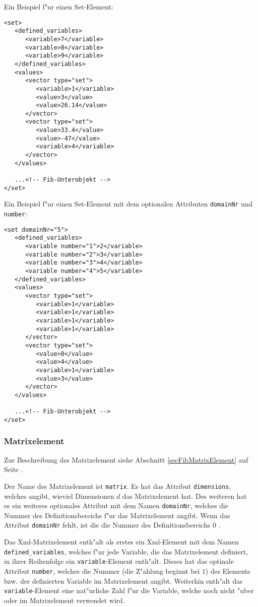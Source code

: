 \bigskip\noindent
Ein Beispiel f"ur einen Set-Element:
\begin{verbatim}
<set>
   <defined_variables>
      <variable>7</variable>
      <variable>8</variable>
      <variable>9</variable>
   </defined_variables>
   <values>
      <vector type="set">
         <variable>1</variable>
         <value>3</value>
         <value>26.14</value>
      </vector>
      <vector type="set">
         <value>33.4</value>
         <value>-47</value>
         <variable>4</variable>
      </vector>
   </values>

   ...<!-- Fib-Unterobjekt -->
</set>
\end{verbatim}

\noindent
Ein Beispiel f"ur einen Set-Element mit dem optionalen Attributen \verb|domainNr| und \verb|number|:
\begin{verbatim}
<set domainNr="5">
   <defined_variables>
      <variable number="1">2</variable>
      <variable number="2">3</variable>
      <variable number="3">4</variable>
      <variable number="4">5</variable>
   </defined_variables>
   <values>
      <vector type="set">
         <variable>1</variable>
         <variable>1</variable>
         <variable>1</variable>
         <variable>1</variable>
      </vector>
      <vector type="set">
         <value>8</value>
         <value>4</value>
         <variable>1</variable>
         <value>3</value>
      </vector>
   </values>

   ...<!-- Fib-Unterobjekt -->
</set>
\end{verbatim}




\subsubsection{Matrixelement}

Zur Beschreibung des Matrixelement siehe Abschnitt \ref{secFibMatrixElement} auf Seite \pageref{secFibMatrixElement} .

Der Name des Matrixelement ist \verb|matrix|. Es hat das Attribut \verb|dimensions|, welches angibt, wieviel Dimensionen $d$ das Matrixelement hat. Des weiteren hat es ein weiteres optionales Attribut mit dem Namen \verb|domainNr|, welches die Nummer des Definitionsbereichs f"ur das Matrixelement angibt. Wenn das Attribut \verb|domainNr| fehlt, ist die die Nummer des Definitionsbereichs $0$ .

Das Xml-Matrixelement enth"alt als erstes ein Xml-Element mit dem Namen \verb|defined_variables|, welches f"ur jede Variable, die das Matrixelement definiert, in ihrer Reihenfolge ein \verb|variable|-Element enth"alt.
Dieses hat das optinale Attribut \verb|number|, welches die Nummer (die Z"ahlung beginnt bei $1$) des Elements bzw. der definierten Variable im Matrixelement angibt. Weiterhin enth"alt das \verb|variable|-Element eine nat"urliche Zahl f"ur die Variable, welche noch nicht "uber oder im Matrixelement verwendet wird.

